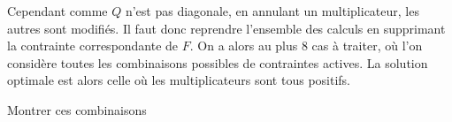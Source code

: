 Cependant comme \(Q\) n'est pas diagonale, en annulant un multiplicateur, les autres sont modifiés.  Il faut donc reprendre l'ensemble des calculs en supprimant la contrainte correspondante de \(F\). On a alors au plus 8 cas à traiter, où l'on considère toutes les combinaisons possibles de contraintes actives. La solution optimale est alors celle où les multiplicateurs sont tous positifs.

\begin{TODO}
  Montrer ces combinaisons
\end{TODO}




